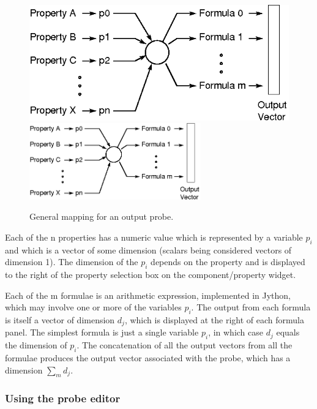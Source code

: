 \documentclass{article}
\begin{document}
\begin{figure}
\begin{center}
\iflatexml
\includegraphics[]{images/outputProbeMap}
\else
\includegraphics[width=0.66\textwidth]{images/outputProbeMap}
\fi
\end{center}
\caption{General mapping for an output probe.}%
\label{OutputProbeMapFig}
\end{figure}

Each of the n properties has a numeric value which is
represented by a variable $p_i$ and which is a vector of some dimension
(scalars being considered vectors of dimension 1). The dimension of
the $p_i$ depends on the property and is displayed to the right of the
property selection box on the component/property widget.

Each of the m formulae is an arithmetic expression, implemented in
Jython, which may involve one or more of the variables $p_i$. The output
from each formula is itself a vector of dimension $d_j$, which is
displayed at the right of each formula panel. The simplest formula is
just a single variable $p_i$, in which case $d_j$ equals the dimension of
$p_i$. The concatenation of all the output vectors from all the formulae
produces the output vector associated with the probe, which has a
dimension $\sum_m d_j$.

\subsubsection{Using the probe editor}
\end{document}
